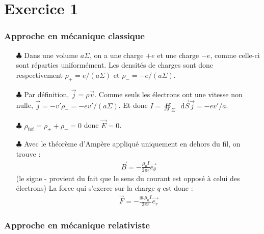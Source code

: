 \documentclass{report}
\newcommand*\dif{\mathop{}\!\mathrm{d}}
\begin{document}
\section*{Exercice 1}

\subsubsection*{Approche en mécanique classique}

\begin{itemize}
	\item[$\clubsuit$] Dans une volume $a\Sigma$, on a une charge $+e$ et une charge $-e$, comme celle-ci sont réparties uniformément. Les densités de charges sont donc respectivement $\rho_+=e/(a\Sigma)$ et $\rho_-=-e/(a\Sigma)$.
	\item[$\clubsuit$] Par définition, $\vec{j}=\rho\vec{v}$. Comme seuls les électrons ont une vitesse non nulle, $\vec{j}=-v'\rho_-=-ev'/(a\Sigma)$. Et donc $I=\oiint_\Sigma\dif\vec{S}\vec{j}=-ev'/a$.
	\item[$\clubsuit$] $\rho_{tot}=\rho_++\rho_-=0$ donc $\vec{E}=0$.
	\item[$\clubsuit$] Avec le théorème d'Ampère appliqué uniquement en dehors du fil, on trouve :
	\begin{align*}
		\vec{B}=-\frac{\mu_0I}{2\pi r}\vec{e_\theta}
	\end{align*}
	(le signe - provient du fait que le sens du courant est opposé à celui des électrons)
	La force qui s'exerce sur la charge $q$ est donc :
	\begin{align*}
		\vec{F}=-\frac{qv\mu_0I}{2\pi r}\vec{e_r}
	\end{align*}
\end{itemize}

\subsubsection*{Approche en mécanique relativiste}
\end{document}
